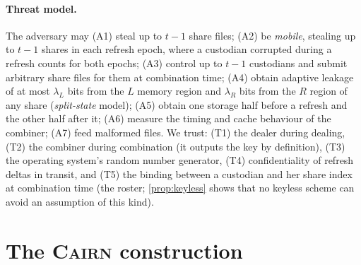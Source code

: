 \documentclass[10.5pt,a4paper]{article}
\theoremstyle{plain}
\theoremstyle{definition}
\newcommand{\cairn}{\textsc{Cairn}}
\begin{document}
\paragraph{Threat model.} The adversary may (A1) steal up to $t-1$ share files; (A2) be \emph{mobile}, stealing up to $t-1$ shares in each refresh epoch, where a custodian corrupted during a refresh counts for both epochs; (A3) control up to $t-1$ custodians and submit arbitrary share files for them at combination time; (A4) obtain adaptive leakage of at most $\lambda_L$ bits from the $L$ memory region and $\lambda_R$ bits from the $R$ region of any share (\emph{split-state} model); (A5) obtain one storage half before a refresh and the other half after it; (A6) measure the timing and cache behaviour of the combiner; (A7) feed malformed files. We trust: (T1) the dealer during dealing, (T2) the combiner during combination (it outputs the key by definition), (T3) the operating system's random number generator, (T4) confidentiality of refresh deltas in transit, and (T5) the binding between a custodian and her share index at combination time (the roster; \cref{prop:keyless} shows that no keyless scheme can avoid an assumption of this kind).

\section{The \cairn{} construction}\label{sec:construction}
\end{document}
